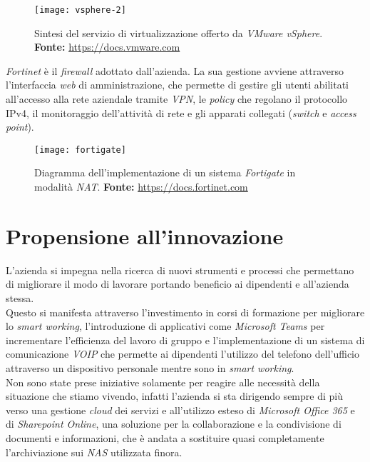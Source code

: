 \begin{figure}[htbp]
	\begin{center}
		\texttt{[image: vsphere-2]}
		\caption{Sintesi del servizio di virtualizzazione offerto da \textit{VMware vSphere}. \newline \textbf{Fonte: } \url{https://docs.vmware.com}}
	\end{center}
\end{figure}


\textit{Fortinet} è il \textit{firewall} adottato dall'azienda. La sua gestione avviene attraverso l'interfaccia \textit{web} di amministrazione, che permette di gestire gli utenti abilitati all'accesso alla rete aziendale tramite \textit{VPN}, le \textit{policy} che regolano il protocollo IPv4, il monitoraggio dell'attività di rete e gli apparati collegati (\textit{switch} e \textit{access point}).

\vspace{10pt}
\begin{figure}[htbp]
	\begin{center}
		\texttt{[image: fortigate]}
		\caption{Diagramma dell'implementazione di un sistema \textit{Fortigate} in modalità \textit{NAT}. \newline \textbf{Fonte: } \url{https://docs.fortinet.com}}
	\end{center}
\end{figure}
\vspace{10pt}


\section{Propensione all'innovazione}

L'azienda si impegna nella ricerca di nuovi strumenti e processi che permettano di migliorare il modo di lavorare portando beneficio ai dipendenti e all'azienda stessa.\\
Questo si manifesta attraverso l'investimento in corsi di formazione per migliorare lo \textit{smart working}, l'introduzione di applicativi come \textit{Microsoft Teams} per incrementare l'efficienza del lavoro di gruppo e l'implementazione di un sistema di comunicazione \textit{VOIP} che permette ai dipendenti l'utilizzo del telefono dell'ufficio attraverso un dispositivo personale mentre sono in \textit{smart working}. \\
Non sono state prese iniziative solamente per reagire alle necessità della situazione che stiamo vivendo, infatti l'azienda si sta dirigendo sempre di più verso una gestione \textit{cloud} dei servizi e all'utilizzo esteso di \textit{Microsoft Office 365} e di \textit{Sharepoint Online}, una soluzione per la collaborazione e la condivisione di documenti e informazioni, che è andata a sostituire quasi completamente l'archiviazione sui \textit{NAS} utilizzata finora.


